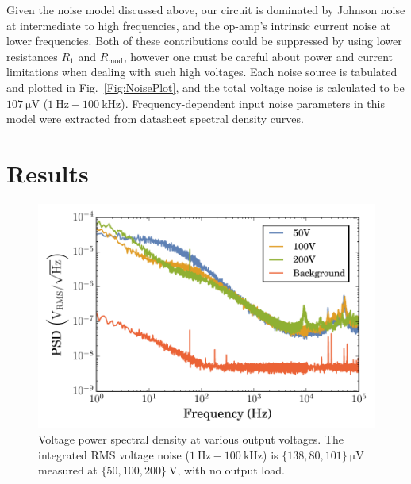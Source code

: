\documentclass[aip,rsi,reprint]{revtex4-1} %
\begin{document}

Given the noise model discussed above, our circuit is dominated by Johnson noise at intermediate to high frequencies, and the op-amp's intrinsic current noise at lower frequencies.
Both of these contributions could be suppressed by using lower resistances $R_1$ and $R_\text{mod}$, however one must be careful about power and current limitations when dealing with such high voltages.
Each noise source is tabulated and plotted in Fig.~\ref{Fig:NoisePlot}, and the total voltage noise  is calculated to be $\SI{107}{\micro\volt}$ ($\SI{1}{\hertz} - \SI{100}{\kilo\hertz}$).
Frequency-dependent input noise parameters in this model were extracted from datasheet spectral density curves\cite{SHEETS}.

\section{Results}
\label{Sec:Results}
\begin{figure}[t]
\includegraphics[width=\columnwidth]{fig/VoltagePSD.pdf}
\caption{Voltage power spectral density at various output voltages. The integrated RMS voltage noise ($\SI{1}{\hertz} - \SI{100}{\kilo\hertz}$) is $\{138, 80, 101\}~\si{\micro\volt}$ measured at  $\{50, 100, 200\}~\si{\volt}$, with no output load. \label{Fig:PSD}}
\end{figure}
\end{document}
